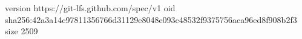 version https://git-lfs.github.com/spec/v1
oid sha256:42a3a14c97811356766d31129e8048e093c48532f9375756aca96ed8f908b2f3
size 2509

